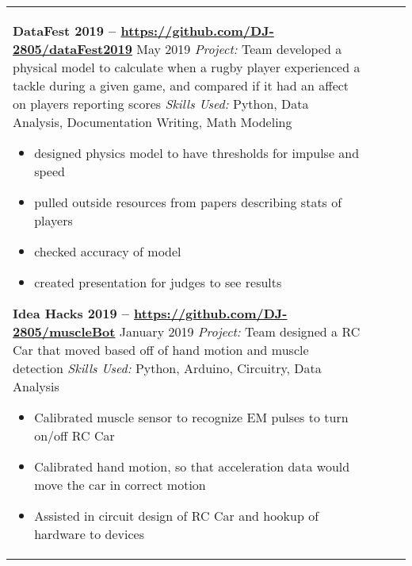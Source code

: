 \documentclass[10pt]{article}
\newcommand*\leftright[2]{%
  \leavevmode
  \rlap{#1}%
  \hspace{0.5\linewidth}%
  #2}
\begin{document}
\begin{longtable}{l l l l}
{        \textbf{DataFest 2019 -- \href{https://github.com/DJ-2805/dataFest2019}{https://github.com/DJ-2805/dataFest2019}} \newline
        \leftright{\textit{Title:} Data Analyst}{May 2019}  \newline
        \textit{Project:} Team developed a physical model to calculate when a rugby player experienced a tackle during a given game, and compared if it had an affect on players reporting scores \newline
        \textit{Skills Used:} Python, Data Analysis, Documentation Writing, Math Modeling
        \begin{itemize}[noitemsep,nolistsep]
            \item designed physics model to have thresholds for impulse and speed
            \item pulled outside resources from papers describing stats of players
            \item checked accuracy of model
            \item created presentation for judges to see results
        \end{itemize}
        
        \textbf{Idea Hacks 2019 -- \href{https://github.com/DJ-2805/muscleBot}{https://github.com/DJ-2805/muscleBot}} \newline
        \leftright{\textit{Title:} Data Analyst}{January 2019} \newline
        \textit{Project:} Team designed a RC Car that moved based off of hand motion and muscle detection \newline
        \textit{Skills Used:} Python, Arduino, Circuitry, Data Analysis
        \begin{itemize}[noitemsep,nolistsep]
            \item Calibrated muscle sensor to recognize EM pulses to turn on/off RC Car
            \item Calibrated hand motion, so that acceleration data would move the car in correct motion
            \item Assisted in circuit design of RC Car and hookup of hardware to devices
        \end{itemize}
        
}
\end{longtable}
\end{document}
